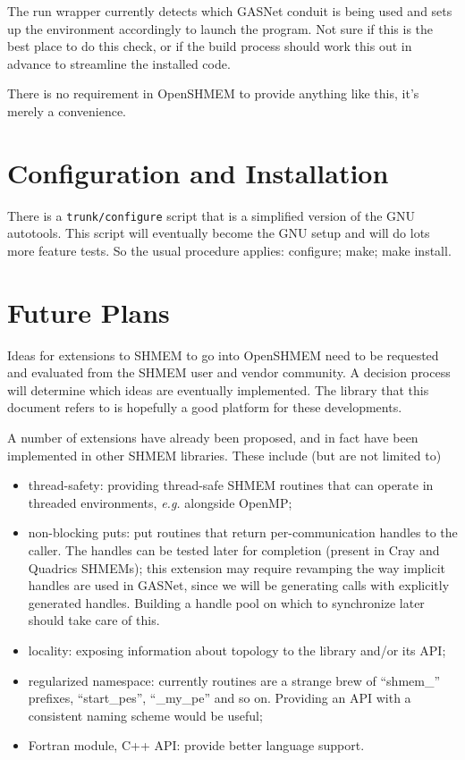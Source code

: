 \documentclass[english]{article}
\begin{document}
The run wrapper currently detects which GASNet conduit is being used
and sets up the environment accordingly to launch the program. Not
sure if this is the best place to do this check, or if the build process
should work this out in advance to streamline the installed code.

There is no requirement in OpenSHMEM to provide anything like this,
it's merely a convenience.


\section{Configuration and Installation}

There is a \texttt{trunk/configure} script that is a simplified version
of the GNU autotools. This script will eventually become the GNU setup
and will do lots more feature tests. So the usual procedure applies:
configure; make; make install.


\section{Future Plans}

Ideas for extensions to SHMEM to go into OpenSHMEM need to be requested
and evaluated from the SHMEM user and vendor community. A decision
process will determine which ideas are eventually implemented. The
library that this document refers to is hopefully a good platform
for these developments.

A number of extensions have already been proposed, and in fact have
been implemented in other SHMEM libraries. These include (but are
not limited to)
\begin{itemize}
\item thread-safety: providing thread-safe SHMEM routines that can operate
in threaded environments, \emph{e.g.} alongside OpenMP;
\item non-blocking puts: put routines that return per-communication handles
to the caller. The handles can be tested later for completion (present
in Cray and Quadrics SHMEMs); this extension may require revamping
the way implicit handles are used in GASNet, since we will be generating
calls with explicitly generated handles. Building a handle pool on
which to synchronize later should take care of this.
\item locality: exposing information about topology to the library and/or
its API;
\item regularized namespace: currently routines are a strange brew of {}``shmem\_''
prefixes, {}``start\_pes'', {}``\_my\_pe'' and so on. Providing
an API with a consistent naming scheme would be useful;
\item Fortran module, C++ API: provide better language support.
\end{itemize}
\end{document}
